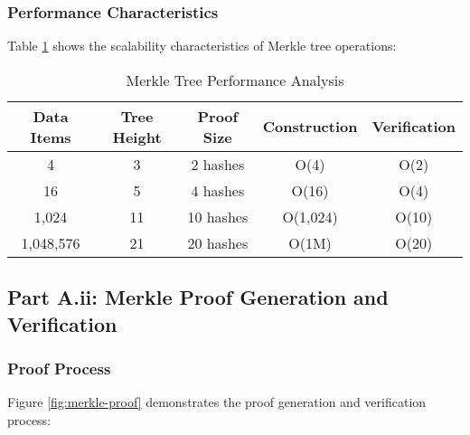 \documentclass[12pt,a4paper]{article}
\begin{document}
\subsubsection{Performance Characteristics}

Table \ref{tab:merkle-performance} shows the scalability characteristics of Merkle tree operations:

\begin{table}[h]
\centering
\begin{tabular}{|c|c|c|c|c|}
\hline
\textbf{Data Items} & \textbf{Tree Height} & \textbf{Proof Size} & \textbf{Construction} & \textbf{Verification} \\
\hline
4 & 3 & 2 hashes & O(4) & O(2) \\
\hline
16 & 5 & 4 hashes & O(16) & O(4) \\
\hline
1,024 & 11 & 10 hashes & O(1,024) & O(10) \\
\hline
1,048,576 & 21 & 20 hashes & O(1M) & O(20) \\
\hline
\end{tabular}
\caption{Merkle Tree Performance Analysis}
\label{tab:merkle-performance}
\end{table}

\subsection{Part A.ii: Merkle Proof Generation and Verification}

\subsubsection{Proof Process}

Figure \ref{fig:merkle-proof} demonstrates the proof generation and verification process:
\end{document}
